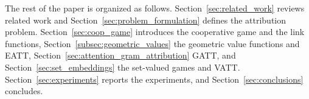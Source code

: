 \documentclass{article}
\begin{document}
The rest of the paper is organized as follows. Section~\ref{sec:related_work} reviews related work and Section~\ref{sec:problem_formulation} defines the attribution problem. Section~\ref{sec:coop_game} introduces the cooperative game and the link functions, Section~\ref{subsec:geometric_values} the geometric value functions and EATT, Section~\ref{sec:attention_gram_attribution} GATT, and Section~\ref{sec:set_embeddings} the set-valued games and VATT. Section~\ref{sec:experiments} reports the experiments, and Section~\ref{sec:conclusions} concludes.



\end{document}
